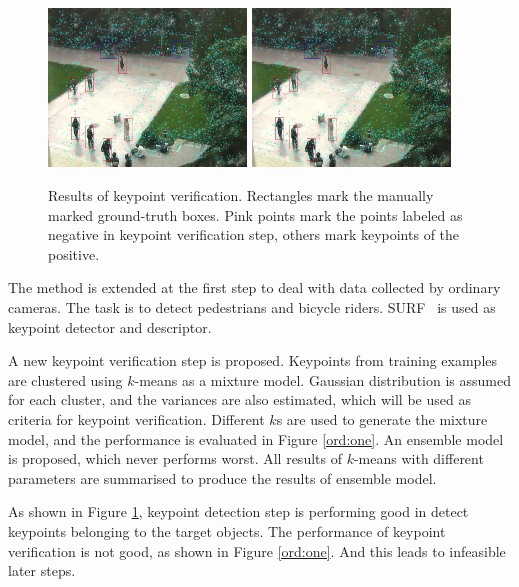 \begin{figure}
{
\includegraphics[width=0.47\textwidth,bb=0 0 720 576]{frame92_af.jpg}
}
{
\includegraphics[width=0.47\textwidth,bb=0 0 720 576]{frame92_af.jpg}
}\\

\caption[Keypoint verification]{Results of keypoint verification. Rectangles mark the manually marked ground-truth boxes. Pink points mark the points labeled as negative in keypoint verification step, others mark keypoints of the positive. }
\label{ord:two}
\end{figure}
The method is extended at the first step to deal with data collected by ordinary cameras. The task is to detect pedestrians and bicycle riders. SURF~\cite{surf} is used as keypoint detector and descriptor. 

A new keypoint verification step is proposed. Keypoints from training examples are clustered using $k$-means as a mixture model. Gaussian distribution is assumed for each cluster, and the variances are also estimated, which will be used as criteria for keypoint verification. Different $k$s are used to generate the mixture model, and the performance is evaluated in Figure \ref{ord:one}.  An ensemble model is proposed, which never performs worst. All results of $k$-means with different parameters are summarised to produce the results of ensemble model.

As shown in Figure \ref{ord:two}, keypoint detection step is performing good in detect keypoints belonging to the target objects. The performance of keypoint verification is not good, as shown in Figure \ref{ord:one}. And this leads to infeasible later steps.

